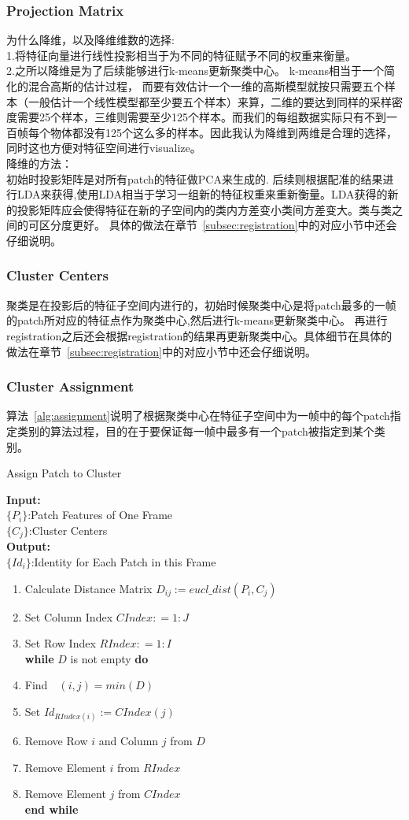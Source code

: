 \subsubsection{Projection Matrix}
为什么降维，以及降维维数的选择:\\
1.将特征向量进行线性投影相当于为不同的特征赋予不同的权重来衡量。\\
2.之所以降维是为了后续能够进行k-means更新聚类中心。 k-means相当于一个简化的混合高斯的估计过程， 而要有效估计一个一维的高斯模型就按只需要五个样本（一般估计一个线性模型都至少要五个样本）来算，二维的要达到同样的采样密度需要25个样本，三维则需要至少125个样本。而我们的每组数据实际只有不到一百帧每个物体都没有125个这么多的样本。因此我认为降维到两维是合理的选择，同时这也方便对特征空间进行visualize。\\
降维的方法：\\
初始时投影矩阵是对所有patch的特征做PCA来生成的.
后续则根据配准的结果进行LDA来获得,使用LDA相当于学习一组新的特征权重来重新衡量。LDA获得的新的投影矩阵应会使得特征在新的子空间内的类内方差变小类间方差变大。类与类之间的可区分度更好。
具体的做法在章节~\ref{subsec:registration}中的对应小节中还会仔细说明。
\subsubsection{Cluster Centers}
聚类是在投影后的特征子空间内进行的，初始时候聚类中心是将patch最多的一帧的patch所对应的特征点作为聚类中心,然后进行k-means更新聚类中心。
再进行registration之后还会根据registration的结果再更新聚类中心。具体细节在具体的做法在章节~\ref{subsec:registration}中的对应小节中还会仔细说明。
\subsubsection{Cluster Assignment}
算法~\ref{alg:assignment}说明了根据聚类中心在特征子空间中为一帧中的每个patch指定类别的算法过程，目的在于要保证每一帧中最多有一个patch被指定到某个类别。
\begin{algorithm}[htb]
\caption{Assign Patch to Cluster}
\label{alg:assignment}
\textbf{Input:}~~\\
$\{P_i\}$:Patch Features of One Frame~~\\
$\{C_j\}$:Cluster Centers~~\\
\textbf{Output:}~~\\
$\{Id_i\}$:Identity for Each Patch in this Frame
\begin{enumerate}
\item Calculate Distance Matrix $D_{ij}:=eucl\_dist(P_i,C_j)$
\item Set Column Index $CIndex: = 1:J$
\item Set Row Index $RIndex: = 1:I$\\
\textbf{while} $D$ is not empty \textbf{do}
\item Find~~$(i,j)=min(D)$
\item Set $Id_{RIndex(i)}:=CIndex(j)$
\item Remove Row $i$ and Column $j$ from $D$
\item Remove Element $i$ from $RIndex$
\item Remove Element $j$ from $CIndex$\\
\textbf{end while}
\end{enumerate}
\end{algorithm}
